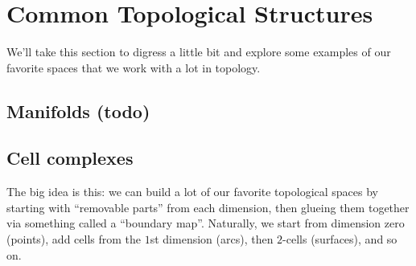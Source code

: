 \section{Common Topological Structures}
We'll take this section to digress a little bit and explore some examples of our favorite spaces that we work with a lot in topology.
\subsection{Manifolds (todo)}
\subsection{Cell complexes}
The big idea is this: we can build a lot of our favorite topological spaces by starting with ``removable parts'' from each dimension, then glueing them together via something called a ``boundary map''. Naturally, we start from dimension zero (points), add cells from the $1$st dimension (arcs), then $2$-cells (surfaces), and so on. 

